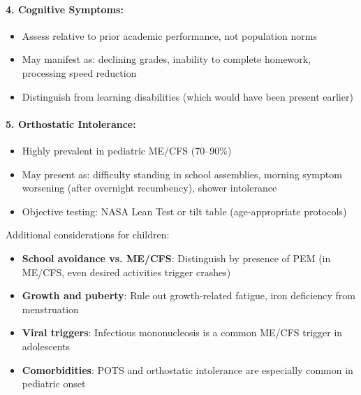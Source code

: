 \begin{requirement}
\paragraph{4. Cognitive Symptoms:}
\begin{itemize}
    \item Assess relative to prior academic performance, not population norms
    \item May manifest as: declining grades, inability to complete homework, processing speed reduction
    \item Distinguish from learning disabilities (which would have been present earlier)
\end{itemize}

\paragraph{5. Orthostatic Intolerance:}
\begin{itemize}
    \item Highly prevalent in pediatric ME/CFS (70--90\%)
    \item May present as: difficulty standing in school assemblies, morning symptom worsening (after overnight recumbency), shower intolerance
    \item Objective testing: NASA Lean Test or tilt table (age-appropriate protocols)
\end{itemize}
\end{requirement}

\begin{warning}
\label{warn:pediatric-differential}
Additional considerations for children:
\begin{itemize}
    \item \textbf{School avoidance vs. ME/CFS}: Distinguish by presence of PEM (in ME/CFS, even desired activities trigger crashes)
    \item \textbf{Growth and puberty}: Rule out growth-related fatigue, iron deficiency from menstruation
    \item \textbf{Viral triggers}: Infectious mononucleosis is a common ME/CFS trigger in adolescents
    \item \textbf{Comorbidities}: POTS and orthostatic intolerance are especially common in pediatric onset
\end{itemize}
\end{warning}

